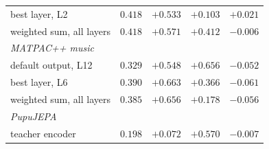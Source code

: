 \begin{table}[t]
\begin{tabular}{l r r r r}
\quad best layer, L2 & \textcolor{hi}{$\mathbf{0.418}$} & $+0.533$ & \textcolor{lo}{$\mathbf{+0.103}$} & $+0.021$ \\
\quad weighted sum, all layers & $0.418$ & $+0.571$ & $+0.412$ & $-0.006$ \\
\multicolumn{5}{l}{\textit{MATPAC++ music~\cite{matpac}}} \\
\quad default output, L12 & $0.329$ & $+0.548$ & $+0.656$ & $-0.052$ \\
\quad best layer, L6 & $0.390$ & \textcolor{hi}{$\mathbf{+0.663}$} & $+0.366$ & \textcolor{lo}{$\mathbf{-0.061}$} \\
\quad weighted sum, all layers & $0.385$ & $+0.656$ & $+0.178$ & $-0.056$ \\
\multicolumn{5}{l}{\textit{PupuJEPA~\cite{pupujepa}}} \\
\quad teacher encoder & \textcolor{lo}{$\mathbf{0.198}$} & $+0.072$ & $+0.570$ & $-0.007$ \\
\bottomrule
\end{tabular}
\end{table}
